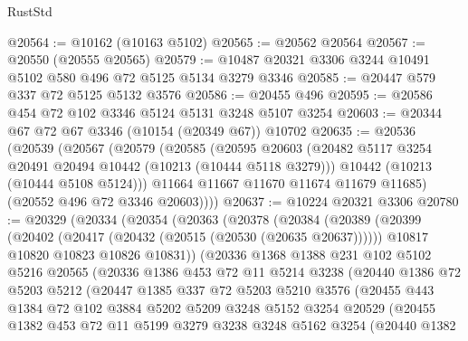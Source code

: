 \begin{lexlean}{RustStd}
\begin{coremodule}
@20564 := @10162 (@10163 @5102)
@20565 := @20562 @20564
@20567 := @20550 (@20555 @20565)
@20579 := @10487 @20321 @3306 @3244 @10491 @5102 @580 @496 @72 @5125 @5134 @3279 @3346
@20585 := @20447 @579 @337 @72 @5125 @5132 @3576
@20586 := @20455 @496
@20595 := @20586 @454 @72 @102 @3346 @5124 @5131 @3248 @5107 @3254
@20603 := @20344 @67 @72 @67 @3346 (@10154 (@20349 @67)) @10702
@20635 := @20536
    (@20539
      (@20567
        (@20579
          (@20585
            (@20595
              @20603
              (@20482 @5117 @3254 @20491 @20494 @10442 (@10213 (@10444 @5118 @3279)))
              @10442
              (@10213 (@10444 @5108 @5124)))
            @11664
            @11667
            @11670
            @11674
            @11679
            @11685)
          (@20552 @496 @72 @3346 @20603))))
@20637 := @10224 @20321 @3306
@20780 := @20329
    (@20334
      (@20354
        (@20363
          (@20378
            (@20384
              (@20389
                (@20399
                  (@20402 (@20417 (@20432 (@20515 (@20530 (@20635 @20637))))))
                  @10817
                  @10820
                  @10823
                  @10826
                  @10831))
              (@20336
                @1368
                @1388
                @231
                @102
                @5102
                @5216
                @20565
                (@20336
                  @1386
                  @453
                  @72
                  @11
                  @5214
                  @3238
                  (@20440
                    @1386
                    @72
                    @5203
                    @5212
                    (@20447
                      @1385
                      @337
                      @72
                      @5203
                      @5210
                      @3576
                      (@20455
                        @443
                        @1384
                        @72
                        @102
                        @3884
                        @5202
                        @5209
                        @3248
                        @5152
                        @3254
                        @20529
                        (@20455
                          @1382
                          @453
                          @72
                          @11
                          @5199
                          @3279
                          @3238
                          @3248
                          @5162
                          @3254
                          (@20440
                            @1382

\end{coremodule}
\end{lexlean}
